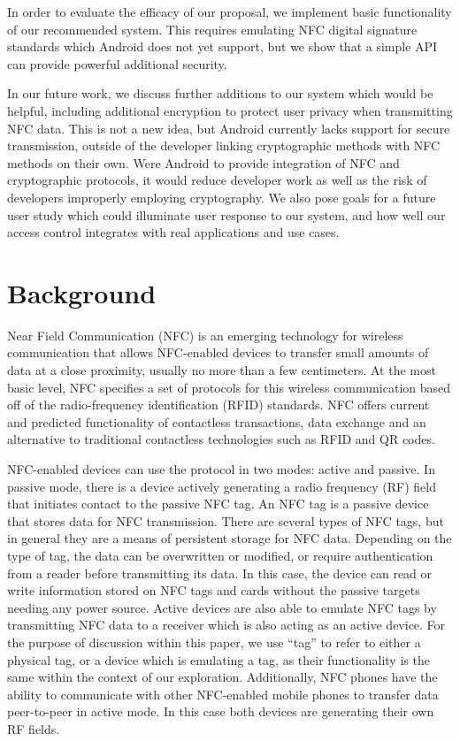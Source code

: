 \documentclass[12pt]{article}
\begin{document}
In order to evaluate the efficacy of our proposal, we implement basic functionality of our recommended system.
This requires emulating NFC digital signature standards which Android does not yet support, but we show that a simple API can provide powerful additional security.

In our future work, we discuss further additions to our system which would be helpful, including additional encryption to protect user privacy when transmitting NFC data.
This is not a new idea, but Android currently lacks support for secure transmission, outside of the developer linking cryptographic methods with NFC methods on their own.
Were Android to provide integration of NFC and cryptographic protocols, it would reduce developer work as well as the risk of developers improperly employing cryptography.
We also pose goals for a future user study which could illuminate user response to our system, and how well our access control integrates with real applications and use cases.

\section{Background}
Near Field Communication (NFC) is an emerging technology for wireless communication that allows NFC-enabled devices to transfer small amounts of data at a close proximity, usually no more than a few centimeters.
At the most basic level, NFC specifies a set of protocols for this wireless communication based off of the radio-frequency identification (RFID) standards.
NFC offers current and predicted functionality of contactless transactions, data exchange and an alternative to traditional contactless technologies such as RFID and QR codes.

NFC-enabled devices can use the protocol in two modes: active and passive.
In passive mode, there is a device actively generating a radio frequency (RF) field that initiates contact to the passive NFC tag.
An NFC tag is a passive device that stores data for NFC transmission.
There are several types of NFC tags, but in general they are a means of persistent storage for NFC data.
Depending on the type of tag, the data can be overwritten or modified, or require authentication from a reader before transmitting its data.
In this case, the device can read or write information stored on NFC tags and cards without the passive targets needing any power source.
Active devices are also able to emulate NFC tags by transmitting NFC data to a receiver which is also acting as an active device.
For the purpose of discussion within this paper, we use ``tag'' to refer to either a physical tag, or a device which is emulating a tag, as their functionality is the same within the context of our exploration.
Additionally, NFC phones have the ability to communicate with other NFC-enabled mobile phones to transfer data peer-to-peer in active mode.
In this case both devices are generating their own RF fields.
\end{document}
